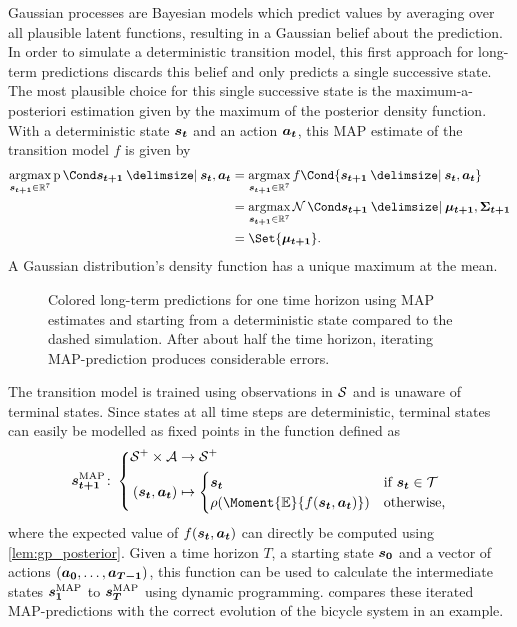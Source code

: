 Gaussian processes are Bayesian models which predict values by averaging over all plausible latent functions, resulting in a Gaussian belief about the prediction.
In order to simulate a deterministic transition model, this first approach for long-term predictions discards this belief and only predicts a single successive state.
The most plausible choice for this single successive state is the maximum-a-posteriori estimation given by the maximum of the posterior density function.
With a deterministic state $\bm{s_t}$ and an action $\bm{a_t}$, this MAP estimate of the transition model $f$ is given by
\begin{align}
    \argmax_{\mat{s_{t+1}} \in \R^7} \Prob{\mat{s_{t+1}} \given \mat{s_t}, \mat{a_t}} &= \argmax_{\mat{s_{t+1}} \in \R^7} f\Cond{\mat{s_{t+1}} \given \mat{s_t}, \mat{a_t}} \\
    &= \argmax_{\mat{s_{t+1}} \in \R^7} \Gaussian{\mat{s_{t+1}} \given \mat{\mu_{t+1}}, \mat{\Sigma_{t+1}}} \\
    &= \Set{\mat{\mu_{t+1}}}.
\end{align}
A Gaussian distribution's density function has a unique maximum at the mean.

\begin{figure}[t]
    \centering
    \caption[MAP long-term predictions]{
        Colored long-term predictions for one time horizon using MAP estimates and starting from a deterministic state compared to the dashed simulation.
        After about half the time horizon, iterating MAP-prediction produces considerable errors.
    }
    \label{fig:map_predictions}
\end{figure}
The transition model is trained using observations in $\mathcal{S}$ and is unaware of terminal states.
Since states at all time steps are deterministic, terminal states can easily be modelled as fixed points in the function defined as
\begin{align}
    \map{\mat{s_{t+1}}} \colon \left\{
        \begin{aligned}
            \Es^+ \times \Ah &\to \Es^+ \\
            (\mat{s_t}, \mat{a_t}) &\mapsto \begin{cases}
            \mat{s_t} & \text{if $\mat{s_t} \in \Tee$} \\
            \squeeze(\Moment{\E}{f(\mat{s_t}, \mat{a_t})}) & \text{otherwise,}
        \end{cases}
    \end{aligned}
    \right.
\end{align}
where the expected value of $f(\bm{s_t}, \bm{a_t})$ can directly be computed using \cref{lem:gp_posterior}.
Given a time horizon $T$, a starting state $\bm{s_0}$ and a vector of actions $(\bm{a_0}, \dots, \bm{a_{T-1}})$, this function can be used to calculate the intermediate states $\bm{s_1}^{\text{MAP}}$ to $\bm{s_T}^{\text{MAP}}$ using dynamic programming.
  compares these iterated MAP-predictions with the correct evolution of the bicycle system in an example.

